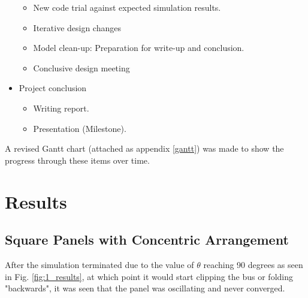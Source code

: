 \begin{itemize}
\begin{itemize}
        \item New code trial against expected simulation results.
        \item Iterative design changes
        \item Model clean-up: Preparation for write-up and conclusion.
        \item Conclusive design meeting
    \end{itemize}
\item Project conclusion
    \begin{itemize}
        \item Writing report.
        \item Presentation (Milestone).
    \end{itemize}
\end{itemize}

A revised Gantt chart (attached as appendix \ref{gantt}) was made to show the progress through these items over time.

\section{Results}


\subsection{Square Panels with Concentric Arrangement}\label{res:squarepanelsconcentricarrangement}

After the simulation terminated due to the value of $\theta$ reaching 90 degrees as seen in Fig. \ref{fig:1_results}, at which point it would start clipping the bus or folding "backwards", it was seen that the panel was oscillating and never converged.

